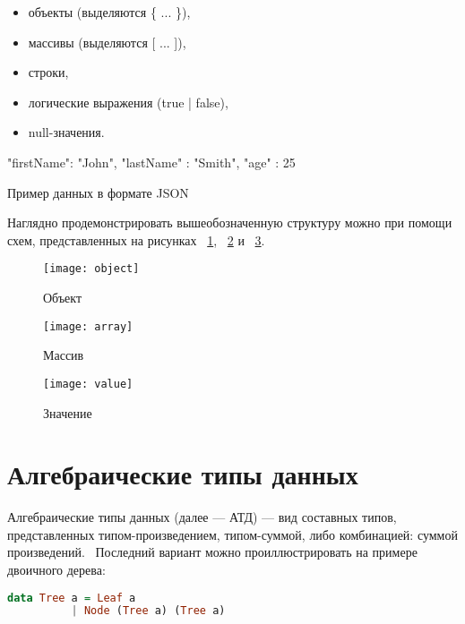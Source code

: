 \begin{itemize}
  \item объекты (выделяются \{ ... \}),
  \item массивы (выделяются [ ... ]),
  \item строки,
  \item логические выражения (true | false),
  \item null-значения.
\end{itemize}

\begin{ListingEnv}[H]
\begin{Verb}
{     
    "firstName": "John",
    "lastName" : "Smith",
    "age" : 25
}
\end{Verb}
\caption{Пример данных в формате JSON}
\label{listing:jsonExample}
\end{ListingEnv}

Наглядно продемонстрировать вышеобозначенную структуру можно при помощи схем, представленных на рисунках ~\ref{fig:objectGr}, ~\ref{fig:arrayGr} и ~\ref{fig:valueGr}.

\begin{figure}[!ht]
\centering
\texttt{[image: object]}
\caption{\label{fig:objectGr}Объект}
\end{figure}

\begin{figure}[!ht]
\centering
\texttt{[image: array]}
\caption{\label{fig:arrayGr}Массив}
\end{figure}

\begin{figure}[!ht]
\centering
\texttt{[image: value]}
\caption{\label{fig:valueGr}Значение}
\end{figure}

\section{Алгебраические типы данных}

Алгебраические типы данных (далее --- АТД) --- вид составных типов, представленных типом-произведением, типом-суммой, либо комбинацией: суммой произведений.~\cite{haskellGreatGood} Последний вариант можно проиллюстрировать на примере двоичного дерева:

\begin{lstlisting}[language=Haskell]
data Tree a = Leaf a
          | Node (Tree a) (Tree a)
\end{lstlisting}

